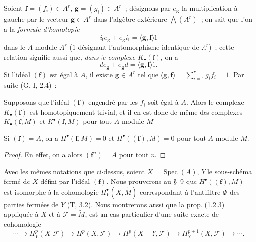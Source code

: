 \begin{env}[1.1.7]
\label{III.1.1.7-fr}
Soient $\mathbf f=(f_i)\in A^r$, $\mathbf g=(g_i)\in A^r$~; désignons par
$e_{\mathbf g}$ la multiplication à gauche par le vecteur
$\mathbf g\in A^r$ dans l'algèbre extérieure $\bigwedge(A^r)$~; on sait que
l'on a la \emph{formule d'homotopie}
\begin{equation}
\label{III.1.1.7.1-fr}
\tag{1.1.7.1}
i_{\mathbf f}e_{\mathbf g}+e_{\mathbf g}i_{\mathbf f}
=\langle\mathbf g,\mathbf f\rangle 1
\end{equation}
dans le $A$-module $A^r$ ($1$ désignant l'automorphisme identique de $A^r$)~;
cette relation signifie aussi que, \emph{dans le complexe
$K_\bullet(\mathbf f)$}, on a
\begin{equation}
\label{III.1.1.7.2-fr}
\tag{1.1.7.2}
de_{\mathbf g}+e_{\mathbf g}d=\langle\mathbf g,\mathbf f\rangle 1.
\end{equation}
Si l'idéal $(\mathbf f)$ est égal à $A$, il existe $\mathbf g\in A^r$ tel que
$\langle\mathbf g,\mathbf f\rangle=\sum_{i=1}^r g_if_i=1$. Par suite
(G, I, 2.4)~:
\end{env}

\begin{proposition}[1.1.8]
\label{III.1.1.8-fr}
Supposons que l'idéal $(\mathbf f)$ engendré par les $f_i$ soit égal à $A$.
Alors le complexe $K_\bullet(\mathbf f)$ est homotopiquement trivial, et il en
est donc de même des complexes $K_\bullet(\mathbf f,M)$ et
$K^\bullet(\mathbf f,M)$ pour tout $A$-module $M$.
\end{proposition}

\begin{corollary}[1.1.9]
\label{III.1.1.9-fr}
Si $(\mathbf f)=A$, on a $H^\bullet(\mathbf f,M)=0$ et
$H^\bullet((\mathbf f),M)=0$ pour tout $A$-module $M$.
\end{corollary}

\begin{proof}
En effet, on a alors $(\mathbf f^n)=A$ pour tout $n$.
\end{proof}

\begin{remark}[1.1.10]
\label{III.1.1.10-fr}
Avec les mêmes notations que ci-dessus, soient $X=\operatorname{Spec}(A)$,
$Y$ le sous-schéma fermé de $X$ défini par l'idéal $(\mathbf f)$. Nous
prouverons au \S~9 que $H^\bullet((\mathbf f),M)$ est isomorphe à la
cohomologie $H_Y^\bullet(X,\widetilde M)$ correspondant à l'antifiltre $\Phi$
des parties fermées de $Y$ (T, 3.2). Nous montrerons aussi que la prop.
(\hyperref[III.1.2.3-fr]{1.2.3}) appliquée à $X$ et à
$\mathcal F=\widetilde M$, est un cas particulier d'une suite exacte de
cohomologie
\[
\cdots\longrightarrow H_Y^p(X,\mathcal F)\longrightarrow H^p(X,\mathcal F)
\longrightarrow H^p(X-Y,\mathcal F)\longrightarrow H_Y^{p+1}(X,\mathcal F)
\longrightarrow\cdots.
\]
\end{remark}

